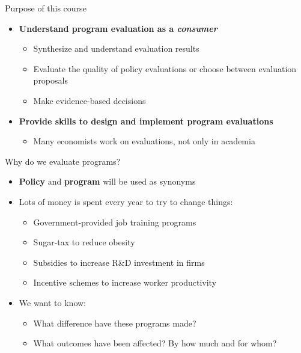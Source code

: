 \documentclass[
  ignorenonframetext,
]{beamer}
\providecommand{\tightlist}{%
  \setlength{\itemsep}{0pt}\setlength{\parskip}{0pt}}
\begin{document}
\begin{frame}{Purpose of this course}
\label{purpose-of-this-course}
\begin{itemize}
\tightlist
\item
  \textbf{Understand program evaluation as a \emph{consumer}}

  \begin{itemize}
  \tightlist
  \item
    Synthesize and understand evaluation results\\
  \item
    Evaluate the quality of policy evaluations or choose between
    evaluation proposals\\
  \item
    Make evidence-based decisions\\
  \end{itemize}
\item
  \textbf{Provide skills to design and implement program evaluations}

  \begin{itemize}
  \tightlist
  \item
    Many economists work on evaluations, not only in academia
  \end{itemize}
\end{itemize}
\end{frame}

\begin{frame}{Why do we evaluate programs?}
\label{why-do-we-evaluate-programs}
\begin{itemize}
\tightlist
\item
  \textbf{Policy} and \textbf{program} will be used as synonyms\\
\item
  Lots of money is spent every year to try to change things:

  \begin{itemize}
  \tightlist
  \item
    Government-provided job training programs\\
  \item
    Sugar-tax to reduce obesity\\
  \item
    Subsidies to increase R\&D investment in firms\\
  \item
    Incentive schemes to increase worker productivity\\
  \end{itemize}
\item
  We want to know:

  \begin{itemize}
  \tightlist
  \item
    What difference have these programs made?\\
  \item
    What outcomes have been affected? By how much and for whom?
  \end{itemize}
\end{itemize}
\end{frame}
\end{document}
